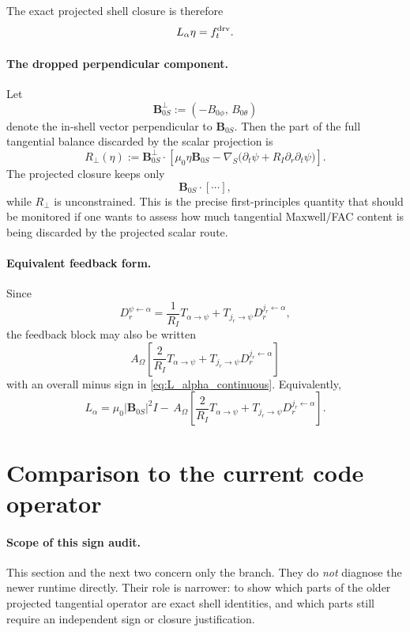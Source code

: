 \documentclass[11pt,a4paper]{article}
\begin{document}
The exact projected shell closure is therefore
\begin{equation}
L_\alpha \eta = f_t^{\rm drv}.
\label{eq:code_matching_closure}
\end{equation}

\paragraph{The dropped perpendicular component.}
Let
\[
\mathbf B_{0S}^{\perp} := (-B_{0\phi},\,B_{0\theta})
\]
denote the in-shell vector perpendicular to $\mathbf B_{0S}$. Then the part of
the full tangential balance discarded by the scalar projection is
\begin{equation}
R_\perp(\eta)
:=
\mathbf B_{0S}^{\perp}\cdot
\left[
\mu_0 \eta \mathbf B_{0S}
-
\nabla_S\!\bigl(\partial_t\psi + R_I \partial_r\partial_t\psi\bigr)
\right].
\label{eq:R_perp}
\end{equation}
The projected closure keeps only
\[
\mathbf B_{0S}\cdot[\cdots],
\]
while $R_\perp$ is unconstrained. This is the precise first-principles quantity
that should be monitored if one wants to assess how much tangential Maxwell/FAC
content is being discarded by the projected scalar route.

\paragraph{Equivalent feedback form.}
Since
\[
D_r^{\psi\leftarrow\alpha}
=
\frac{1}{R_I}T_{\alpha\to\psi}
+
T_{j_r\to\psi} D_r^{j_r\leftarrow\alpha},
\]
the feedback block may also be written
\[
A_\Omega\!\left[
\frac{2}{R_I}T_{\alpha\to\psi}
+
T_{j_r\to\psi} D_r^{j_r\leftarrow\alpha}
\right]
\]
with an overall minus sign in \eqref{eq:L_alpha_continuous}. Equivalently,
\[
L_\alpha
=
\mu_0 |\mathbf B_{0S}|^2 I
-\,
A_\Omega\!\left[
\frac{2}{R_I}T_{\alpha\to\psi}
+
T_{j_r\to\psi} D_r^{j_r\leftarrow\alpha}
\right].
\]

\section{Comparison to the current code operator}

\paragraph{Scope of this sign audit.}
This section and the next two concern only the
 branch. They do \emph{not} diagnose the newer
 runtime directly. Their role is narrower: to show which
parts of the older projected tangential operator are exact shell identities,
and which parts still require an independent sign or closure justification.
\end{document}
